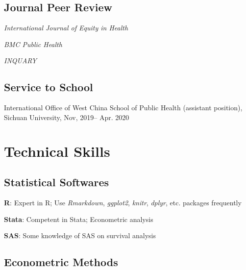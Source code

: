 \documentclass[12pt,letterpaper]{report}
\newcommand{\listitemspace}{0.15em}
\renewenvironment{itemize}
{\begin{list}{}{\setlength{\leftmargin}{0em}
            \setlength{\parskip}{0em}
            \setlength{\itemsep}{\listitemspace}
            \setlength{\parsep}{\listitemspace}}}
    {\end{list}}
\begin{document}
    \subsection*{Journal Peer Review}

    \begin{itemize}
        
        \item \textit{International Journal of Equity in Health}
        \item \textit{BMC Public Health}
        \item  \textit{INQUARY}
       
    \end{itemize}

	
    \subsection*{Service to School}

    \begin{itemize}
    	
    	\item International Office of West China School of Public Health (assistant position), Sichuan University, Nov, 2019-- Apr. 2020
       
    \end{itemize}
	


    \section*{Technical Skills}

    \subsection*{Statistical Softwares}

    \begin{itemize}

        \item \textbf{R}: Expert in R; Use \textit{Rmarkdown}, \textit{ggplot2}, \textit{knitr}, \textit{dplyr}, etc. packages frequently
        \item \textbf{Stata}: Competent in Stata; Econometric analysis
        \item \textbf{SAS}: Some knowledge of SAS on survival analysis

    \end{itemize}
   
    \subsection*{Econometric Methods}
\end{document}
